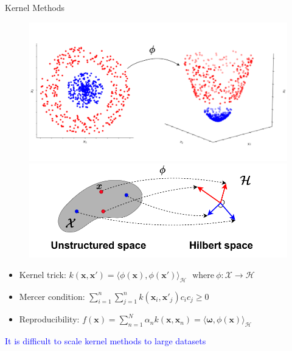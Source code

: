 \documentclass[aspectratio=169]{beamer}
\begin{document}
\begin{frame}{Kernel Methods}

\begin{figure}
    \centering \includegraphics[width=0.4\linewidth]{Figures/classic_kernels_view.pdf}
    \includegraphics[width=0.5\linewidth]{Figures/spacesHilbert.pdf}
\end{figure}


\begin{itemize}

    \item Kernel trick: $k(\mathbf{x},\mathbf{x}') = \langle \phi(\mathbf{x}), \phi(\mathbf{x}') \rangle_{\mathcal{H}} \ \ \
    \text{where}\  \phi: \mathcal{X} \rightarrow \mathcal{H}$

    \item Mercer condition: $\sum_{i=1}^n \sum_{j=1}^n k(\mathbf{x}_i,\mathbf{x}'_j) c_i c_j \geq 0$


    \item Reproducibility: $f(\mathbf{x}) = \sum_{n=1}^{N} \alpha_n k(\mathbf{x}, \mathbf{x}_n) = \langle \boldsymbol{\omega}, \phi(\mathbf{x}) \rangle_{\mathcal{H}}$
\end{itemize}

\begin{center}
    \textcolor{blue}{It is difficult to scale kernel methods to large datasets}
\end{center}

\end{frame}
\end{document}
